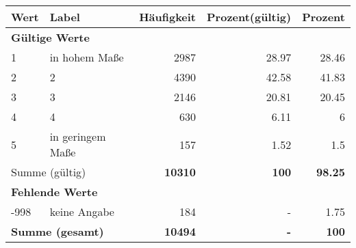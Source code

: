      \begin{longtable}{lXrrr}
     \toprule
     \textbf{Wert} & \textbf{Label} & \textbf{Häufigkeit} & \textbf{Prozent(gültig)} & \textbf{Prozent} \\
     \endhead
     \midrule
     \multicolumn{5}{l}{\textbf{Gültige Werte}}\\

     1 &
     \multicolumn{1}{X}{ in hohem Maße   } &


       \num{2987} &
       \num[round-mode=places,round-precision=2]{28.97} &
         \num[round-mode=places,round-precision=2]{28.46} \\

     2 &
     \multicolumn{1}{X}{ 2   } &


       \num{4390} &
       \num[round-mode=places,round-precision=2]{42.58} &
         \num[round-mode=places,round-precision=2]{41.83} \\

     3 &
     \multicolumn{1}{X}{ 3   } &


       \num{2146} &
       \num[round-mode=places,round-precision=2]{20.81} &
         \num[round-mode=places,round-precision=2]{20.45} \\

     4 &
     \multicolumn{1}{X}{ 4   } &


       \num{630} &
       \num[round-mode=places,round-precision=2]{6.11} &
         \num[round-mode=places,round-precision=2]{6} \\

     5 &
     \multicolumn{1}{X}{ in geringem Maße   } &


       \num{157} &
       \num[round-mode=places,round-precision=2]{1.52} &
         \num[round-mode=places,round-precision=2]{1.5} \\
     \midrule
     \multicolumn{2}{l}{Summe (gültig)} &
       \textbf{\num{10310}} &
     \textbf{\num{100}} &
       \textbf{\num[round-mode=places,round-precision=2]{98.25}} \\
     \multicolumn{5}{l}{\textbf{Fehlende Werte}}\\
       -998 &
       keine Angabe &
         \num{184} &
        - &
         \num[round-mode=places,round-precision=2]{1.75} \\
     \midrule
     \multicolumn{2}{l}{\textbf{Summe (gesamt)}} &
          \textbf{\num{10494}} &
        \textbf{-} &
        \textbf{\num{100}} \\
     \bottomrule
     \end{longtable}
     
